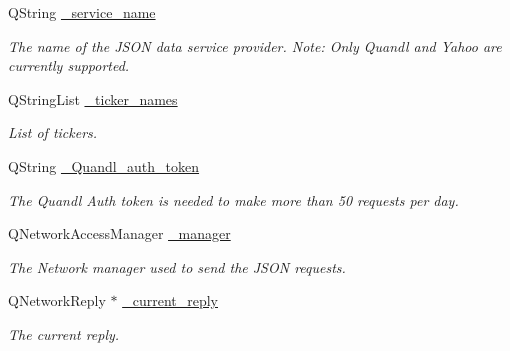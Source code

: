 \begin{DoxyCompactItemize}
\item 
\hypertarget{class_json_query_acc3c7eca201fdc8e1ebc5d1f8763631c}{Q\+String \hyperlink{class_json_query_acc3c7eca201fdc8e1ebc5d1f8763631c}{\+\_\+service\+\_\+name}}\label{class_json_query_acc3c7eca201fdc8e1ebc5d1f8763631c}

\begin{DoxyCompactList}\small\item\em The name of the J\+S\+O\+N data service provider. Note\+: Only Quandl and Yahoo are currently supported. \end{DoxyCompactList}\item 
\hypertarget{class_json_query_adf76972f9f175db206bb842fc73e7913}{Q\+String\+List \hyperlink{class_json_query_adf76972f9f175db206bb842fc73e7913}{\+\_\+ticker\+\_\+names}}\label{class_json_query_adf76972f9f175db206bb842fc73e7913}

\begin{DoxyCompactList}\small\item\em List of tickers. \end{DoxyCompactList}\item 
\hypertarget{class_json_query_a9f7f1c04e4e659e94046eafb7c9d65a9}{Q\+String \hyperlink{class_json_query_a9f7f1c04e4e659e94046eafb7c9d65a9}{\+\_\+\+Quandl\+\_\+auth\+\_\+token}}\label{class_json_query_a9f7f1c04e4e659e94046eafb7c9d65a9}

\begin{DoxyCompactList}\small\item\em The Quandl Auth token is needed to make more than 50 requests per day. \end{DoxyCompactList}\item 
\hypertarget{class_json_query_a6a656b6284308e14c88cd2f325d3f82d}{Q\+Network\+Access\+Manager \hyperlink{class_json_query_a6a656b6284308e14c88cd2f325d3f82d}{\+\_\+manager}}\label{class_json_query_a6a656b6284308e14c88cd2f325d3f82d}

\begin{DoxyCompactList}\small\item\em The Network manager used to send the J\+S\+O\+N requests. \end{DoxyCompactList}\item 
\hypertarget{class_json_query_a421d1210dc3918200f4b2fad77f98726}{Q\+Network\+Reply $\ast$ \hyperlink{class_json_query_a421d1210dc3918200f4b2fad77f98726}{\+\_\+current\+\_\+reply}}\label{class_json_query_a421d1210dc3918200f4b2fad77f98726}

\begin{DoxyCompactList}\small\item\em The current reply. \end{DoxyCompactList}\end{DoxyCompactItemize}


